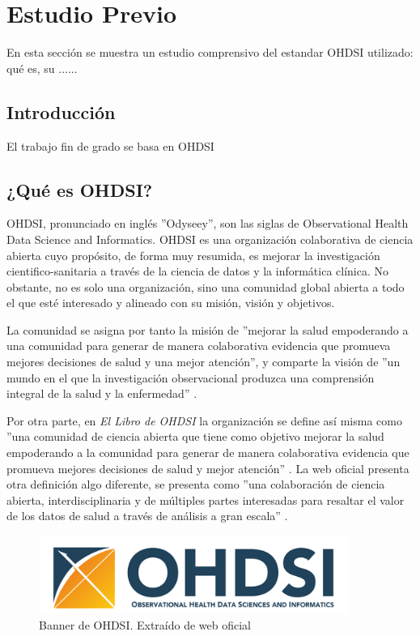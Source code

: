 \chapter{Estudio Previo}\label{cap:05EstudioPrevio}

En esta sección se muestra un estudio comprensivo del estandar OHDSI utilizado: qué es, su ......

\section{Introducción}

El trabajo fin de grado se basa en OHDSI

\section{¿Qué es OHDSI?}

OHDSI, pronunciado en inglés ''Odyseey'', son las siglas de Observational Health Data Science and Informatics. OHDSI es una organización colaborativa de ciencia abierta cuyo propósito, de forma muy resumida, es mejorar la investigación cientifico-sanitaria a través de la ciencia de datos y la informática clínica. No obstante, no es solo una organización, sino una comunidad global abierta a todo el que esté interesado y alineado con su misión, visión y objetivos. 

La comunidad se asigna por tanto la misión de ''mejorar la salud empoderando a una comunidad para generar de manera colaborativa evidencia que promueva mejores decisiones de salud y una mejor atención'', y comparte la visión de ''un mundo en el que la investigación observacional produzca una comprensión integral de la salud y la enfermedad'' \cite{OHDSIwebsite}\cite{OHDSIbook}. 

Por otra parte, en \textit{El Libro de OHDSI} la organización se define así misma como ''una comunidad de ciencia abierta que tiene como objetivo mejorar la salud empoderando a la comunidad para generar de manera colaborativa evidencia que promueva mejores decisiones de salud y mejor atención'' \cite{OHDSIbook}. La web oficial presenta otra definición algo diferente, se presenta como ''una colaboración de ciencia abierta, interdisciplinaria y de múltiples partes interesadas para resaltar el valor de los datos de salud a través de análisis a gran escala'' \cite{OHDSIwebsite}.

\begin{figure}[H]
    \centering
    \includegraphics[width=0.90\textwidth]{figures/OHDSIbanner.png}
    \caption{Banner de OHDSI. Extraído de web oficial \cite{OHDSIwebsite}}
    \label{fig:enter-label}
\end{figure}

